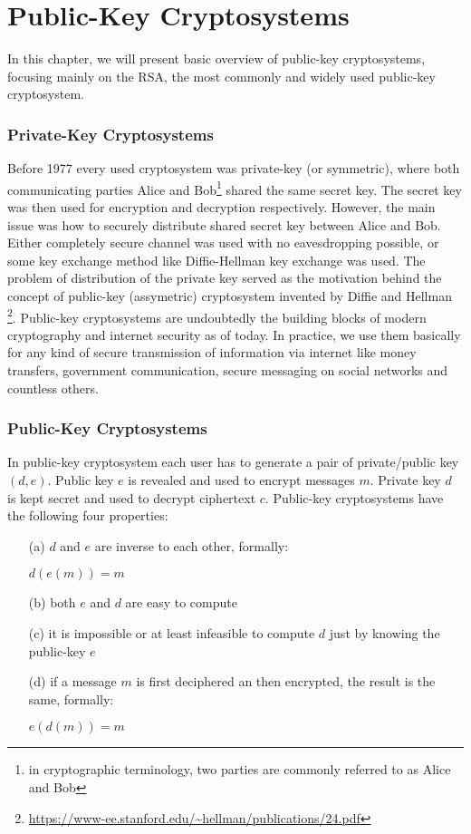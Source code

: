 \chapter{Public-Key Cryptosystems}

In this chapter, we will present basic overview of public-key cryptosystems, focusing mainly on the RSA, the most commonly and widely used public-key cryptosystem. 

\subsection*{Private-Key Cryptosystems}

Before 1977 every used cryptosystem was private-key (or symmetric), where both communicating parties Alice and Bob\footnote{in cryptographic terminology, two parties are commonly referred to as Alice and Bob} shared the same secret key. The secret key was then used for encryption and decryption respectively. However, the main issue was how to securely distribute shared secret key between Alice and Bob. Either completely secure channel was used with no eavesdropping possible, or some key exchange method like Diffie-Hellman key exchange\cite{diffie_hellman} was used. The problem of distribution of the private key served as the motivation behind the concept of public-key (assymetric) cryptosystem invented by Diffie and Hellman \cite{diffie_hellman}\footnote{\url{https://www-ee.stanford.edu/~hellman/publications/24.pdf}}. Public-key cryptosystems are undoubtedly the building blocks of modern cryptography and internet security as of today. In practice, we use them basically for any kind of secure transmission of information via internet like money transfers, government communication, secure messaging on social networks and countless others.

\subsection*{Public-Key Cryptosystems}

In public-key cryptosystem each user has to generate a pair of private/public key $(d,e)$. Public key $e$ is revealed and used to encrypt messages $m$. Private key $d$ is kept secret and used to decrypt ciphertext $c$. Public-key cryptosystems have the following four properties:

\begin{itemize}

	\item[(a)] $d$ and $e$ are inverse to each other, formally:

$d(e(m)) = m$

	\item[(b)] both $e$ and $d$ are easy to compute

	\item[(c)] it is impossible or at least infeasible to compute $d$ just by knowing the public-key $e$

	\item[(d)] if a message $m$ is first deciphered an then encrypted, the result is the same, formally:
    
$e(d(m)) = m$

\end{itemize}

